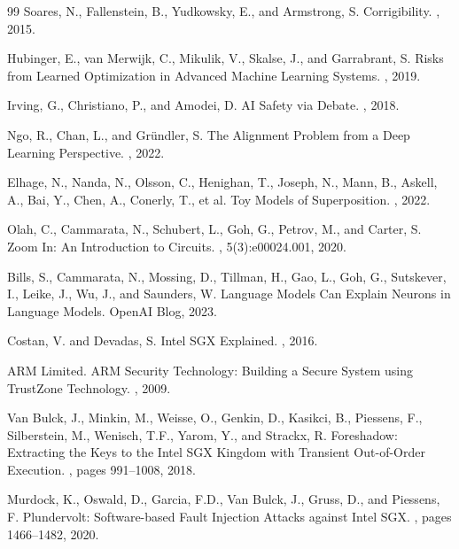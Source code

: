\documentclass[11pt,a4paper]{article}
\begin{document}
\begin{thebibliography}{99}
Soares, N., Fallenstein, B., Yudkowsky, E., and Armstrong, S.
\newblock Corrigibility.
, 2015.

Hubinger, E., van Merwijk, C., Mikulik, V., Skalse, J., and Garrabrant, S.
\newblock Risks from Learned Optimization in Advanced Machine Learning Systems.
, 2019.

Irving, G., Christiano, P., and Amodei, D.
\newblock AI Safety via Debate.
, 2018.

Ngo, R., Chan, L., and Gr\"{u}ndler, S.
\newblock The Alignment Problem from a Deep Learning Perspective.
, 2022.

Elhage, N., Nanda, N., Olsson, C., Henighan, T., Joseph, N., Mann, B., Askell, A., Bai, Y., Chen, A., Conerly, T., et al.
\newblock Toy Models of Superposition.
, 2022.

Olah, C., Cammarata, N., Schubert, L., Goh, G., Petrov, M., and Carter, S.
\newblock Zoom In: An Introduction to Circuits.
, 5(3):e00024.001, 2020.

Bills, S., Cammarata, N., Mossing, D., Tillman, H., Gao, L., Goh, G., Sutskever, I., Leike, J., Wu, J., and Saunders, W.
\newblock Language Models Can Explain Neurons in Language Models.
\newblock OpenAI Blog, 2023.

Costan, V. and Devadas, S.
\newblock Intel SGX Explained.
, 2016.

ARM Limited.
\newblock ARM Security Technology: Building a Secure System using TrustZone Technology.
, 2009.

Van Bulck, J., Minkin, M., Weisse, O., Genkin, D., Kasikci, B., Piessens, F., Silberstein, M., Wenisch, T.F., Yarom, Y., and Strackx, R.
\newblock Foreshadow: Extracting the Keys to the Intel SGX Kingdom with Transient Out-of-Order Execution.
, pages 991--1008, 2018.

Murdock, K., Oswald, D., Garcia, F.D., Van Bulck, J., Gruss, D., and Piessens, F.
\newblock Plundervolt: Software-based Fault Injection Attacks against Intel SGX.
, pages 1466--1482, 2020.


\end{thebibliography}
\end{document}

